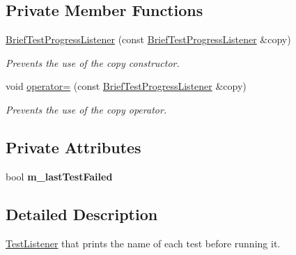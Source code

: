 \subsection*{Private Member Functions}
\begin{DoxyCompactItemize}
\item 
\hyperlink{class_brief_test_progress_listener_a8ef9b88bc4b12c59be439eeca363c7ff}{Brief\+Test\+Progress\+Listener} (const \hyperlink{class_brief_test_progress_listener}{Brief\+Test\+Progress\+Listener} \&copy)\hypertarget{class_brief_test_progress_listener_a8ef9b88bc4b12c59be439eeca363c7ff}{}\label{class_brief_test_progress_listener_a8ef9b88bc4b12c59be439eeca363c7ff}

\begin{DoxyCompactList}\small\item\em Prevents the use of the copy constructor. \end{DoxyCompactList}\item 
void \hyperlink{class_brief_test_progress_listener_acdeb99499dbd62a724345fbf08d3f015}{operator=} (const \hyperlink{class_brief_test_progress_listener}{Brief\+Test\+Progress\+Listener} \&copy)\hypertarget{class_brief_test_progress_listener_acdeb99499dbd62a724345fbf08d3f015}{}\label{class_brief_test_progress_listener_acdeb99499dbd62a724345fbf08d3f015}

\begin{DoxyCompactList}\small\item\em Prevents the use of the copy operator. \end{DoxyCompactList}\end{DoxyCompactItemize}
\subsection*{Private Attributes}
\begin{DoxyCompactItemize}
\item 
bool {\bfseries m\+\_\+last\+Test\+Failed}\hypertarget{class_brief_test_progress_listener_afca444f678cef495ae7ed7224e9250fb}{}\label{class_brief_test_progress_listener_afca444f678cef495ae7ed7224e9250fb}

\end{DoxyCompactItemize}


\subsection{Detailed Description}
\hyperlink{class_test_listener}{Test\+Listener} that prints the name of each test before running it. 

